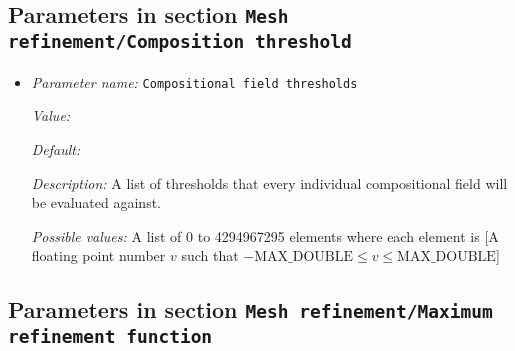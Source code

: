\subsection{Parameters in section \tt Mesh refinement/Composition threshold}
\label{parameters:Mesh_20refinement/Composition_20threshold}

\begin{itemize}
\item {\it Parameter name:} {\tt Compositional field thresholds}
\label{parameters:Mesh refinement/Composition threshold/Compositional field thresholds}


{\it Value:} 


{\it Default:} 


{\it Description:} A list of thresholds that every individual compositional field will be evaluated against.


{\it Possible values:} A list of 0 to 4294967295 elements where each element is [A floating point number $v$ such that $-\text{MAX\_DOUBLE} \leq v \leq \text{MAX\_DOUBLE}$]
\end{itemize}

\subsection{Parameters in section \tt Mesh refinement/Maximum refinement function}
\label{parameters:Mesh_20refinement/Maximum_20refinement_20function}

